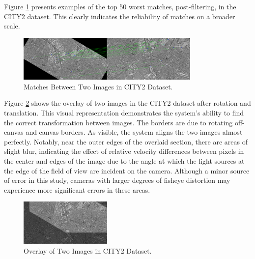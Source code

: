 Figure \ref{fig:Matches_CITY2} presents examples of the top 50 worst matches, post-filtering, in the CITY2 dataset. This clearly indicates the reliability of matches on a broader scale.

\begin{figure}[H]
    \centering
    \includegraphics[width=0.8\textwidth]{Chapter 5/RESULTPLOTS/appfigs/matches.png}
    \caption{Matches Between Two Images in CITY2 Dataset.}
    \label{fig:Matches_CITY2}
\end{figure}



Figure \ref{fig:Overlay_CITY2} shows the overlay of two images in the CITY2 dataset after rotation and translation. This visual representation demonstrates the system's ability to find the correct transformation between images. The borders are due to rotating off-canvas and canvas borders. As visible, the system aligns the two images almost perfectly. Notably, near the outer edges of the overlaid section, there are areas of slight blur, indicating the effect of relative velocity differences between pixels in the center and edges of the image due to the angle at which the light sources at the edge of the field of view are incident on the camera. Although a minor source of error in this study, cameras with larger degrees of fisheye distortion may experience more significant errors in these areas.



\begin{figure}[H]
    \centering
    \includegraphics[width=0.4\textwidth]{Chapter 5/RESULTPLOTS/appfigs/OVERLAY.png}
    \caption{Overlay of Two Images in CITY2 Dataset.}
    \label{fig:Overlay_CITY2}
\end{figure}



